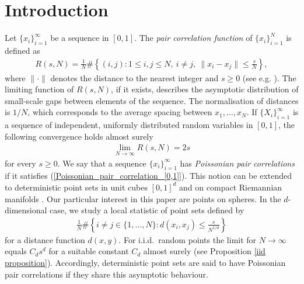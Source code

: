 \documentclass[a4paper,11pt]{amsart}
\begin{document}
\section{Introduction}
Let $\{x_i\}_{i=1}^\infty$ be a sequence in $[0,1]$. The \textit{pair correlation function} of $\{x_i\}_{i=1}^N$ is defined as
\begin{align*}
    R(s,N)=\frac{1}{N}\#\left\{(i,j):1\leq i,j\leq N,\ i\neq j,\ \|x_i-x_j\|\leq\frac{s}{N}\right\},
\end{align*}
where $\|\cdot\|$ denotes the distance to the nearest integer and $s\geq 0$ (see e.g. \cite{Rudnick1998}). The limiting function  of $R(s,N)$, if it exists, describes the asymptotic distribution of small-scale gaps between elements of the sequence. The normalisation of distances is $1/N$, which corresponds to the average spacing between $x_1,\dots,x_N$. If $\{X_i\}_{i=1}^\infty$ is a sequence of independent, uniformly distributed random variables in $[0,1]$, the following convergence holds almost surely
\begin{align}\label{Poissonian_pair_correlation_[0,1]}
   \lim\limits_{N\rightarrow\infty}R(s,N)=2s
\end{align}for every $s\geq 0$. We say that a sequence $\{x_i\}_{i=1}^\infty$ has \textit{Poissonian pair correlations} if it satisfies (\ref{Poissonian_pair_correlation_[0,1]}). 
This notion can be extended to deterministic point sets in unit cubes $[0,1]^d$ \cite{Bera2024,Hinrichs2019,Steinerberger2020} and on compact Riemannian manifolds \cite{Marklof2019}. Our particular interest in this paper are points on spheres. In the $d$-dimensional case, we study a local statistic of point sets defined by
\begin{align}\label{1/N indeces}
    \frac{1}{N}\#\left\{i\neq j\in\{1,\dots,N\}\colon d(x_i,x_j)\leq \frac{s}{N^{1/d}}\right\}
\end{align}
for a distance function $d(x,y)$. For i.i.d.\  random points the limit for $N\rightarrow\infty$ equals $C_ds^d$ for a suitable constant $C_d$ almost surely (see Proposition \ref{iid proposition}). Accordingly, deterministic point sets are said to have Poissonian pair correlations if they share this asymptotic behaviour. 
\end{document}
